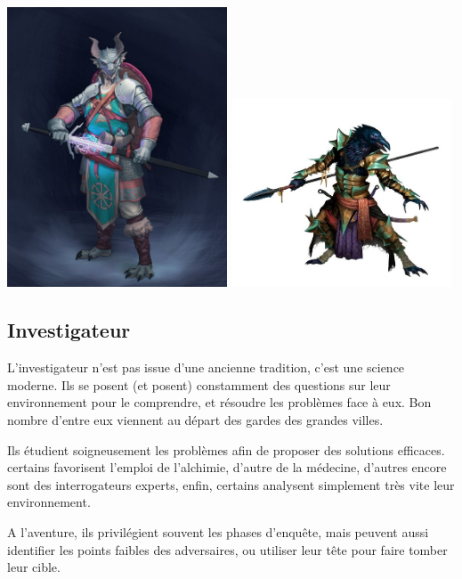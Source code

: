 \documentclass[10pt,a4paper]{book}
\begin{document}
\includegraphics[width=0.49\textwidth]{guerrier 1}
\includegraphics[width=0.49\textwidth]{guerrier 2}
\subsection{Investigateur}
L'investigateur n'est pas issue d'une ancienne tradition, c'est une science moderne. Ils se posent (et posent) constamment des questions sur leur environnement pour le comprendre, et résoudre les problèmes face à eux. Bon nombre d'entre eux viennent au départ des gardes des grandes villes.

Ils étudient soigneusement les problèmes afin de proposer des solutions efficaces. certains favorisent l'emploi de l'alchimie, d'autre de la médecine, d'autres encore sont des interrogateurs experts, enfin, certains analysent simplement très vite leur environnement.

A l'aventure, ils privilégient souvent les phases d'enquête, mais peuvent aussi identifier les points faibles des adversaires, ou utiliser leur tête pour faire tomber leur cible.
\end{document}
